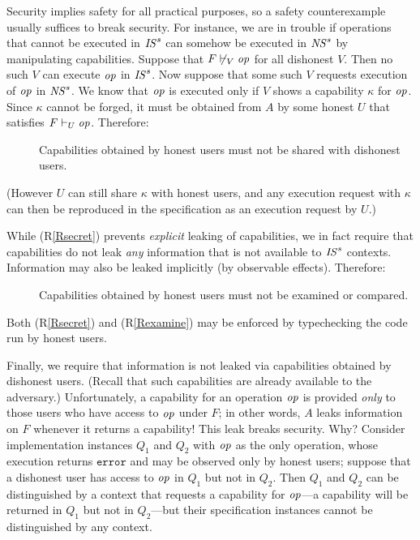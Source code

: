 \documentclass[10pt]{article}
\makeatletter
\newcounter{Crules}
\newcommand{\op}{{\it op}}
\newcommand{\R}{\addtocounter{Crules}{1}R\arabic{Crules}\gdef\@currentlabel{\arabic{Crules}}}
\makeatother
\begin{document}
Security implies safety for all practical purposes, so a safety counterexample usually suffices to break security. For instance, we are in trouble if operations that cannot be executed in ${\it IS}^s$ can somehow be executed in ${\it NS}^s$ by manipulating capabilities. Suppose that $F \not\vdash_V \op$ for all dishonest $V$. Then no such $V$ can execute $\op$ in ${\it IS}^s$. Now suppose that some such $V$ requests execution of $\op$ in ${\it NS}^s$. We know that $\op$ is executed only if $V$ shows a capability $\kappa$ for $\op$. Since $\kappa$ cannot be forged, it must be obtained from $A$ by some honest $U$ that satisfies $F \vdash_U \op$. Therefore:
\begin{description}
\item[\R]\label{Rsecret} Capabilities obtained by honest users must not be shared with dishonest users.
\end{description}
(However $U$ can still share $\kappa$ with honest users, and any execution request with $\kappa$ can then be reproduced in the specification as an execution request by $U$.)

While (R\ref{Rsecret}) prevents \emph{explicit} leaking of capabilities, we in fact require that capabilities do not leak \emph{any} information that is not available to ${\it IS}^s$ contexts. Information may also be leaked implicitly (by observable effects). Therefore:
\begin{description}
\item[\R]\label{Rexamine} Capabilities obtained by honest users must not be examined or compared. \end{description}
Both (R\ref{Rsecret}) and (R\ref{Rexamine}) may be enforced by typechecking the code run by honest users. 

Finally, we require that information is not leaked via capabilities obtained by dishonest users. (Recall that such capabilities are already available to the adversary.) Unfortunately, a capability for an operation $\op$ is provided \emph{only} to those users who have access to $\op$ under $F$; in other words, $A$ leaks information on $F$ whenever it returns a capability! This leak breaks security.
Why? Consider implementation instances $Q_1$ and $Q_2$ with $\op$ as the only operation, whose execution returns $\mathtt{error}$ and may be observed only by honest users; suppose that a dishonest user has access to $\op$ in $Q_1$ but not in $Q_2$. Then $Q_1$ and $Q_2$ can be distinguished by a context that requests a capability for $\op$---a capability will be returned in $Q_1$ but not in $Q_2$---but their specification instances cannot be distinguished by any context. 
\end{document}
